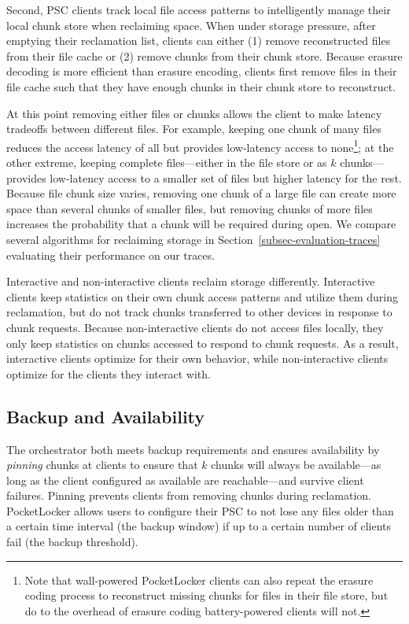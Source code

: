 Second, PSC clients track local file access patterns to intelligently manage
their local chunk store when reclaiming space. When under storage pressure,
after emptying their reclamation list, clients can either (1) remove
reconstructed files from their file cache or (2) remove chunks from their
chunk store. Because erasure decoding is more efficient than erasure
encoding, clients first remove files in their file cache such that they have
enough chunks in their chunk store to reconstruct.


At this point removing either files or chunks allows the client to make
latency tradeoffs between different files. For example, keeping one chunk of
many files reduces the access latency of all but provides low-latency access
to none\footnote{Note that wall-powered PocketLocker clients can also repeat
the erasure coding process to reconstruct missing chunks for files in their
file store, but do to the overhead of erasure coding battery-powered clients
will not.}; at the other extreme, keeping complete files---either in the file
store or as $k$ chunks---provides low-latency access to a smaller set of
files but higher latency for the rest. Because file chunk size varies,
removing one chunk of a large file can create more space than several chunks
of smaller files, but removing chunks of more files increases the probability
that a chunk will be required during open. We compare several algorithms for
reclaiming storage in Section~\ref{subsec-evaluation-traces} evaluating their
performance on our traces.

Interactive and non-interactive clients reclaim storage differently.
Interactive clients keep statistics on their own chunk access patterns and
utilize them during reclamation, but do not track chunks transferred to other
devices in response to chunk requests. Because non-interactive clients do not
access files locally, they only keep statistics on chunks accessed to respond
to chunk requests. As a result, interactive clients optimize for their own
behavior, while non-interactive clients optimize for the clients they
interact with.

\subsection{Backup and Availability}
\label{subsec-backup}

The orchestrator both meets backup requirements and ensures availability by
\textit{pinning} chunks at clients to ensure that $k$ chunks will always be
available---as long as the client configured as available are reachable---and
survive client failures. Pinning prevents clients from removing chunks during
reclamation. PocketLocker allows users to configure their PSC to not lose any
files older than a certain time interval (the backup window) if up to a
certain number of clients fail (the backup threshold).

